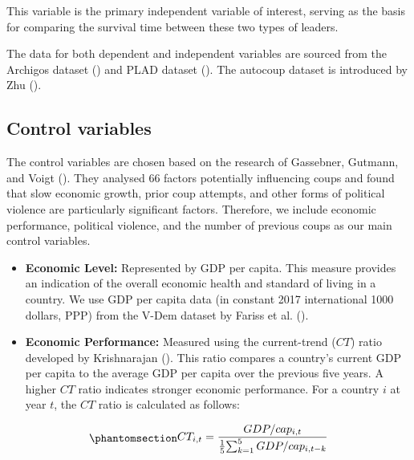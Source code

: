 \documentclass[
  12pt,
]{article}
\providecommand{\tightlist}{%
  \setlength{\itemsep}{0pt}\setlength{\parskip}{0pt}}\usepackage{longtable,booktabs,array}
\begin{document}
This variable is the primary independent variable of interest, serving
as the basis for comparing the survival time between these two types of
leaders.

The data for both dependent and independent variables are sourced from
the Archigos dataset () and PLAD dataset
(). The
autocoup dataset is introduced by Zhu ().

\subsection{Control variables}\label{control-variables}

The control variables are chosen based on the research of Gassebner,
Gutmann, and Voigt (). They analysed
66 factors potentially influencing coups and found that slow economic
growth, prior coup attempts, and other forms of political violence are
particularly significant factors. Therefore, we include economic
performance, political violence, and the number of previous coups as our
main control variables.

\begin{itemize}
\tightlist
\item
  \textbf{Economic Level:} Represented by GDP per capita. This measure
  provides an indication of the overall economic health and standard of
  living in a country. We use GDP per capita data (in constant 2017
  international 1000 dollars, PPP) from the V-Dem dataset by Fariss et
  al. ().
\item
  \textbf{Economic Performance:} Measured using the current-trend
  (\(CT\)) ratio developed by Krishnarajan
  (). This ratio compares a
  country's current GDP per capita to the average GDP per capita over
  the previous five years. A higher \(CT\) ratio indicates stronger
  economic performance. For a country \(i\) at year \(t\), the \(CT\)
  ratio is calculated as follows:
\end{itemize}

\begin{equation}\phantomsection\label{eq-eq6}{
    \begin{aligned}
    CT_{i,t} = {GDP/cap_{i,t} \over {1 \over 5} {\sum_{k=1}^5GDP/cap_{i,t-k}}}
    \end{aligned}
}\end{equation}
\end{document}
